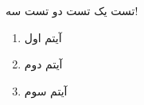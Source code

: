 \documentclass{beamer}
\begin{document}
\begin{frame}
تست یک
\pause
تست دو
\pause
تست سه!
\begin{enumerate}\raggedleft
\item
آیتم اول
\pause
\item
آیتم دوم
\pause
\item
آیتم سوم
\end{enumerate}
\end{frame}
\end{document}
